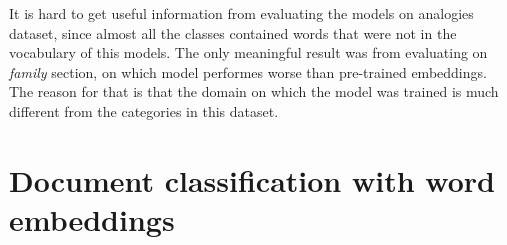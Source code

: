\documentclass{article}
\begin{document}
It is hard to get useful information from evaluating the models on analogies dataset,
since almost all the classes contained words that were not in the vocabulary of this models.
The only meaningful result was from evaluating on \textit{family} section, on which model performes
worse than pre-trained embeddings. The reason for that is that the domain on which the model was 
trained is much different from the categories in this dataset.

\section{Document classification with word embeddings}
% 

% 		





\end{document}
